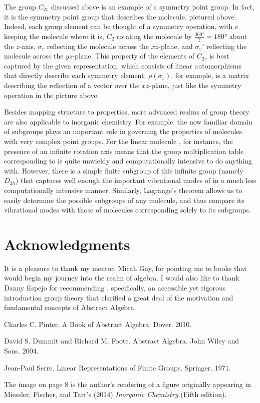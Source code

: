 \documentclass[openany, amssymb, psamsfonts]{amsart}
\theoremstyle{definition}
\numberwithin{equation}{section}
\begin{document}
The group $C_{2v}$ discussed above is an example of a symmetry point group. In fact, it is the symmetry point group that describes the  molecule, pictured above. Indeed, each group element can be thought of a symmetry operation, with $e$ keeping the molecule where it is, $C_2$ rotating the molecule by $\frac{\ang{360}}{2}=\ang{180}$ about the $z$-axis, $\sigma_v$ reflecting the molecule across the $xz$-plane, and $\sigma_v'$ reflecting the molecule across the $yz$-plane. This property of the elements of $C_{2v}$ is best captured by the given representation, which consists of linear automorphisms that directly describe each symmetry element: $\rho(\sigma_v)$, for example, is a matrix describing the reflection of a vector over the $xz$-plane, just like the symmetry operation in the picture above.\par
Besides mapping structure to properties, more advanced realms of group theory are also applicable to inorganic chemistry. For example, the now familiar domain of subgroups plays an important role in governing the properties of molecules with very complex point groups. For the linear molecule , for instance, the presence of an infinite rotation axis means that the group multiplication table corresponding to  is quite unwieldy and computationally intensive to do anything with. However, there is a simple finite subgroup of this infinite group (namely $D_{2h}$) that captures well enough the important vibrational modes of  in a much less computationally intensive manner. Similarly, Lagrange's theorem allows us to easily determine the possible subgroups of any molecule, and thus compare its vibrational modes with those of molecules corresponding solely to its subgroups.



\section*{Acknowledgments}
It is a pleasure to thank my mentor, Micah Gay, for pointing me to books that would begin my journey into the realm of algebra. I would also like to thank Danny Espejo for recommending \cite{pinter}, specifically, an accessible yet rigorous introduction group theory that clarified a great deal of the motivation and fundamental concepts of Abstract Algebra.



\begin{thebibliography}{9}
    Charles C. Pinter.
    A Book of Abstract Algebra.
    Dover. 2010.

    David S. Dummit and Richard M. Foote.
    Abstract Algebra.
    John Wiley and Sons. 2004.
    
    Jean-Paul Serre.
    Linear Representations of Finite Groups.
    Springer. 1971.
\end{thebibliography}
The image on page 8 is the author's rendering of a figure originally appearing in Miessler, Fischer, and Tarr's (2014) \emph{Inorganic Chemistry} (Fifth edition).
\end{document}
